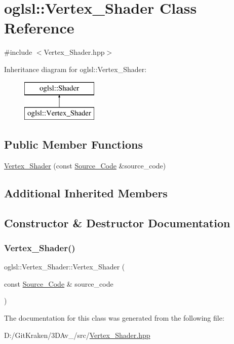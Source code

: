 \hypertarget{classoglsl_1_1_vertex___shader}{}\section{oglsl\+:\+:Vertex\+\_\+\+Shader Class Reference}
\label{classoglsl_1_1_vertex___shader}


{\ttfamily \#include $<$Vertex\+\_\+\+Shader.\+hpp$>$}

Inheritance diagram for oglsl\+:\+:Vertex\+\_\+\+Shader\+:\begin{figure}[H]
\begin{center}
\leavevmode
\includegraphics[height=2.000000cm]{classoglsl_1_1_vertex___shader}
\end{center}
\end{figure}
\subsection*{Public Member Functions}
\begin{DoxyCompactItemize}
\item 
\mbox{\hyperlink{classoglsl_1_1_vertex___shader_a73b6548dd06f676a8f7a0882e7f73ad3}{Vertex\+\_\+\+Shader}} (const \mbox{\hyperlink{classoglsl_1_1_shader_1_1_source___code}{Source\+\_\+\+Code}} \&source\+\_\+code)
\end{DoxyCompactItemize}
\subsection*{Additional Inherited Members}


\subsection{Constructor \& Destructor Documentation}
\mbox{\label{classoglsl_1_1_vertex___shader_a73b6548dd06f676a8f7a0882e7f73ad3}} 
\subsubsection{\texorpdfstring{Vertex\+\_\+\+Shader()}{Vertex\_Shader()}}
{\footnotesize\ttfamily oglsl\+::\+Vertex\+\_\+\+Shader\+::\+Vertex\+\_\+\+Shader (\begin{DoxyParamCaption}\item[{const \mbox{\hyperlink{classoglsl_1_1_shader_1_1_source___code}{Source\+\_\+\+Code}} \&}]{source\+\_\+code }\end{DoxyParamCaption})\hspace{0.3cm}{\ttfamily [inline]}}



The documentation for this class was generated from the following file\+:\begin{DoxyCompactItemize}
\item 
D\+:/\+Git\+Kraken/3\+D\+Av\+\_/src/\mbox{\hyperlink{_vertex___shader_8hpp}{Vertex\+\_\+\+Shader.\+hpp}}\end{DoxyCompactItemize}
